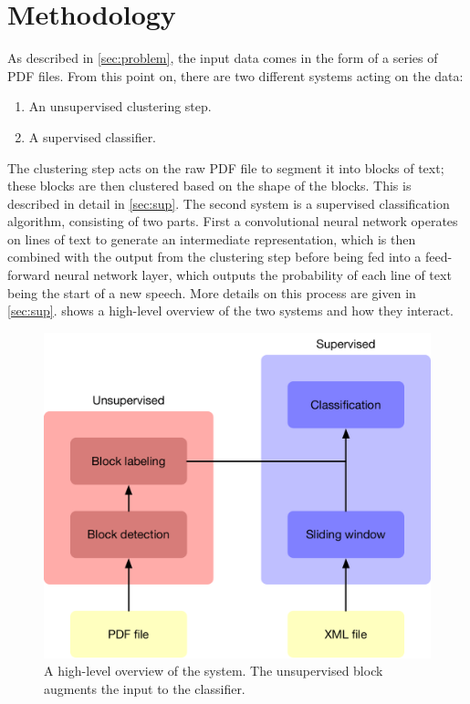 \section{Methodology}%
\label{sec:method}

As described in \cref{sec:problem}, the input data comes in the form of a
series of PDF files. From this point on, there are two different systems
acting on the data:
\begin{enumerate}
  \item An unsupervised clustering step.
  \item A supervised classifier.
\end{enumerate}

The clustering step acts on the raw PDF file to segment it into blocks of
text; these blocks are then clustered based on the shape of the blocks. This
is described in detail in \cref{sec:sup}. The second system is a supervised
classification algorithm, consisting of two parts. First a convolutional
neural network operates on lines of text to generate an intermediate
representation, which is then combined with the output from the clustering
step before being fed into a feed-forward neural network layer,
which outputs the probability of each line of text being the
start of a new speech. More details on this process are given in
\cref{sec:sup}.  shows a high-level overview of the two
systems and how they interact.
\begin{figure}[tb]
  \centering
  \includegraphics[width=\textwidth]{figures/layout.pdf}
  \caption{A high-level overview of the system. The unsupervised block augments
  the input to the classifier.\label{fig:overview}}
\end{figure}

